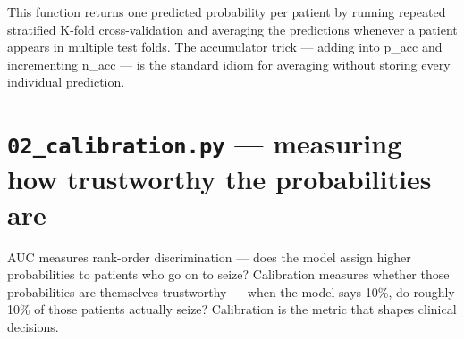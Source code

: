 \documentclass[11pt,a4paper]{article}
\begin{document}
This function returns one predicted probability per patient by running repeated stratified K-fold cross-validation and averaging the predictions whenever a patient appears in multiple test folds. The accumulator trick --- adding into p\_acc and incrementing n\_acc --- is the standard idiom for averaging without storing every individual prediction.
\clearpage
\section{\texttt{02\_calibration.py} — measuring how trustworthy the probabilities are}
AUC measures rank-order discrimination --- does the model assign higher probabilities to patients who go on to seize? Calibration measures whether those probabilities are themselves trustworthy --- when the model says 10\%, do roughly 10\% of those patients actually seize? Calibration is the metric that shapes clinical decisions.
\end{document}
